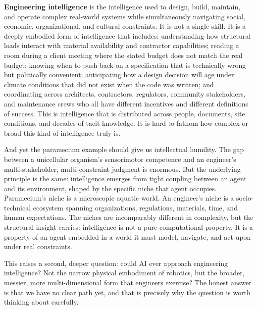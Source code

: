 \documentclass[12pt]{article}
\begin{document}
\textbf{Engineering intelligence} is the intelligence used to design, build, maintain, and operate complex real-world systems while simultaneously navigating social, economic, organizational, and cultural constraints. It is not a single skill. It is a deeply embodied form of intelligence that includes: understanding how structural loads interact with material availability and contractor capabilities; reading a room during a client meeting where the stated budget does not match the real budget; knowing when to push back on a specification that is technically wrong but politically convenient; anticipating how a design decision will age under climate conditions that did not exist when the code was written; and coordinating across architects, contractors, regulators, community stakeholders, and maintenance crews who all have different incentives and different definitions of success. This is intelligence that is distributed across people, documents, site conditions, and decades of tacit knowledge. It is hard to fathom how complex or broad this kind of intelligence truly is.

And yet the paramecium example should give us intellectual humility. The gap between a unicellular organism's sensorimotor competence and an engineer's multi-stakeholder, multi-constraint judgment is enormous. But the underlying principle is the same: intelligence emerges from tight coupling between an agent and its environment, shaped by the specific niche that agent occupies. Paramecium's niche is a microscopic aquatic world. An engineer's niche is a socio-technical ecosystem spanning organizations, regulations, materials, time, and human expectations. The niches are incomparably different in complexity, but the structural insight carries: intelligence is not a pure computational property. It is a property of an agent embedded in a world it must model, navigate, and act upon under real constraints.

This raises a second, deeper question: could AI ever approach engineering intelligence? Not the narrow physical embodiment of robotics, but the broader, messier, more multi-dimensional form that engineers exercise? The honest answer is that we have no clear path yet, and that is precisely why the question is worth thinking about carefully.
\end{document}
